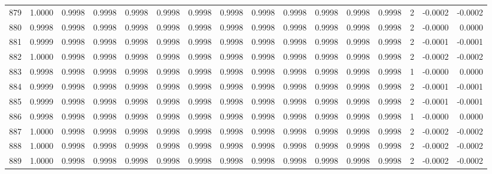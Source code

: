 \begin{tabular}{lrrrrrrrrrrrrrrr}
879 &      1.0000 &  0.9998 &  0.9998 &  0.9998 &  0.9998 &  0.9998 &  0.9998 &  0.9998 &  0.9998 &  0.9998 &   0.9998 &     0.9998 &      2 &                   -0.0002 &                    -0.0002 \\
880 &      0.9998 &  0.9998 &  0.9998 &  0.9998 &  0.9998 &  0.9998 &  0.9998 &  0.9998 &  0.9998 &  0.9998 &   0.9998 &     0.9998 &      2 &                   -0.0000 &                     0.0000 \\
881 &      0.9999 &  0.9998 &  0.9998 &  0.9998 &  0.9998 &  0.9998 &  0.9998 &  0.9998 &  0.9998 &  0.9998 &   0.9998 &     0.9998 &      2 &                   -0.0001 &                    -0.0001 \\
882 &      1.0000 &  0.9998 &  0.9998 &  0.9998 &  0.9998 &  0.9998 &  0.9998 &  0.9998 &  0.9998 &  0.9998 &   0.9998 &     0.9998 &      2 &                   -0.0002 &                    -0.0002 \\
883 &      0.9998 &  0.9998 &  0.9998 &  0.9998 &  0.9998 &  0.9998 &  0.9998 &  0.9998 &  0.9998 &  0.9998 &   0.9998 &     0.9998 &      1 &                   -0.0000 &                     0.0000 \\
884 &      0.9999 &  0.9998 &  0.9998 &  0.9998 &  0.9998 &  0.9998 &  0.9998 &  0.9998 &  0.9998 &  0.9998 &   0.9998 &     0.9998 &      2 &                   -0.0001 &                    -0.0001 \\
885 &      0.9999 &  0.9998 &  0.9998 &  0.9998 &  0.9998 &  0.9998 &  0.9998 &  0.9998 &  0.9998 &  0.9998 &   0.9998 &     0.9998 &      2 &                   -0.0001 &                    -0.0001 \\
886 &      0.9998 &  0.9998 &  0.9998 &  0.9998 &  0.9998 &  0.9998 &  0.9998 &  0.9998 &  0.9998 &  0.9998 &   0.9998 &     0.9998 &      1 &                   -0.0000 &                     0.0000 \\
887 &      1.0000 &  0.9998 &  0.9998 &  0.9998 &  0.9998 &  0.9998 &  0.9998 &  0.9998 &  0.9998 &  0.9998 &   0.9998 &     0.9998 &      2 &                   -0.0002 &                    -0.0002 \\
888 &      1.0000 &  0.9998 &  0.9998 &  0.9998 &  0.9998 &  0.9998 &  0.9998 &  0.9998 &  0.9998 &  0.9998 &   0.9998 &     0.9998 &      2 &                   -0.0002 &                    -0.0002 \\
889 &      1.0000 &  0.9998 &  0.9998 &  0.9998 &  0.9998 &  0.9998 &  0.9998 &  0.9998 &  0.9998 &  0.9998 &   0.9998 &     0.9998 &      2 &                   -0.0002 &                    -0.0002 \\

\end{tabular}
